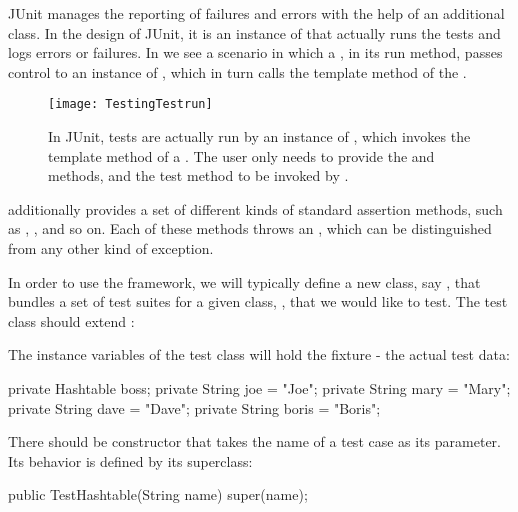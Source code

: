 \documentclass[a4paper,10pt,twoside]{book}
\begin{document}
JUnit manages the reporting of failures and errors with the help of an additional  class. In the design of JUnit, it is an instance of  that actually runs the tests and logs errors or failures. In  we see a scenario in which a , in its run method, passes control to an instance of , which in turn calls the  template method of the .

\begin{figure}[tb]
\begin{center}
\texttt{[image: TestingTestrun]}
\caption{In JUnit, tests are actually run by an instance of , which invokes the  template method of a . The user only needs to provide the  and  methods, and the test method to be invoked by .}
\end{center}
\end{figure}

 additionally provides a set of different kinds of standard assertion methods, such as , , and so on. Each of these methods throws an , which can be distinguished from any other kind of exception.

In order to use the framework, we will typically define a new class, say , that bundles a set of test suites for a given class, , that we would like to test. The test class should extend :

\begin{code}
import junit.framework.*;
import java.util.Hashtable;

public class TestHashtable extends TestCase {
\end{code}

The instance variables of the test class will hold the fixture - the actual test data:

\begin{code}
	private Hashtable boss;
	private String joe = "Joe";
	private String mary = "Mary";
	private String dave = "Dave";
	private String boris = "Boris";
\end{code}

There should be constructor that takes the name of a test case as its parameter. Its behavior is defined by its superclass:

\begin{code}
	public TestHashtable(String name) {
		super(name);
	}
\end{code}
\end{document}
